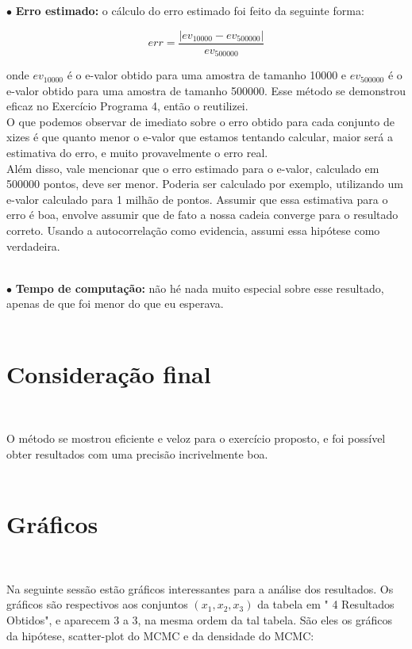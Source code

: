 \documentclass[pt12]{article}
\begin{document}
$\bullet$ \textbf{Erro estimado:} o cálculo do erro estimado foi feito da seguinte forma:

$$err = \frac{|ev_{10000} - ev_{500000}|}{ev_{500000}}$$

onde $ev_{10000}$ é o e-valor obtido para uma amostra de tamanho 10000 e  $ev_{500000}$ é o e-valor obtido para uma amostra de tamanho 500000. Esse método se demonstrou eficaz no Exercício Programa 4, então o reutilizei.\\
O que podemos observar de imediato sobre o erro obtido para cada conjunto de xizes é que quanto menor o e-valor que estamos tentando calcular, maior será a estimativa do erro, e muito provavelmente o erro real.\\
Além disso, vale mencionar que o erro estimado para o e-valor, calculado em 500000 pontos, deve ser menor. Poderia ser calculado por exemplo, utilizando um e-valor calculado para 1 milhão de pontos. Assumir que essa estimativa para o erro é boa, envolve assumir que de fato a nossa cadeia converge para o resultado correto. Usando a autocorrelação como evidencia, assumi essa hipótese como verdadeira.\\
\ 

$\bullet$ \textbf{Tempo de computação:} não hé nada muito especial sobre esse resultado, apenas de que foi menor do que eu esperava.\\
\ 

\section{Consideração final}
\ 

O método se mostrou eficiente e veloz para o exercício proposto, e foi possível obter resultados com uma precisão incrivelmente boa.\\
\ 

\section{Gráficos}
\ 

Na seguinte sessão estão gráficos interessantes para a análise dos resultados. Os gráficos são respectivos aos conjuntos $(x_1,x_2,x_3)$ da tabela em " 4 Resultados Obtidos", e aparecem 3 a 3, na mesma ordem da tal tabela. São eles os gráficos da hipótese, scatter-plot do MCMC e da densidade do MCMC:
\newpage
\end{document}
